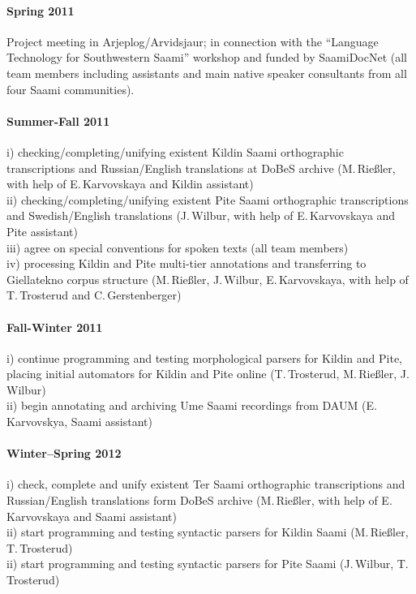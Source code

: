 \documentclass[a4paper,12pt]{article}
\begin{document}
{{{{\paragraph{Spring 2011}Project meeting in Arjeplog/Arvidsjaur; in connection with the “Language Technology for Southwestern Saami” workshop and funded by SaamiDocNet (all team members including assistants and main native speaker consultants from all four Saami communities).

\paragraph{Summer-Fall 2011}
i) checking/completing/unifying existent Kildin Saami orthographic transcriptions and Russian/English translations at DoBeS archive (M.\,Rießler, with help of E.\,Karvovskaya and Kildin assistant)\\
ii) checking/completing/unifying existent Pite Saami orthographic transcriptions and Swedish/English translations (J.\,Wilbur, with help of E.\,Karvovskaya and Pite assistant)\\%
iii) agree on special conventions for spoken texts (all team members)\\
iv) processing Kildin and Pite multi-tier annotations %
and transferring to Giellatekno corpus structure (M.\,Rießler, J.\,Wilbur, E.\,Karvovskaya, with help of T.\,Trosterud and C.\,Gerstenberger)

\paragraph{Fall-Winter 2011}
i) continue programming and testing morphological parsers for Kildin and Pite, %
placing initial automators for Kildin and Pite online %
(T.\,Trosterud, M.\,Rießler, J.\,Wilbur)\\
ii) begin annotating and archiving Ume Saami recordings from DAUM (E.\,Karvovskya, Saami assistant)

\paragraph{Winter–Spring 2012}
i) check, complete and unify existent Ter Saami orthographic transcriptions and Russian/English translations form DoBeS archive (M.\,Rießler, with help of E.\,Karvovskaya and Saami assistant)\\
ii) start programming and testing syntactic parsers for Kildin Saami (M.\,Rießler, T.\,Trosterud)\\
ii) start programming and testing syntactic parsers for Pite Saami (J.\,Wilbur, T.\,Trosterud)

}}}}
\end{document}
